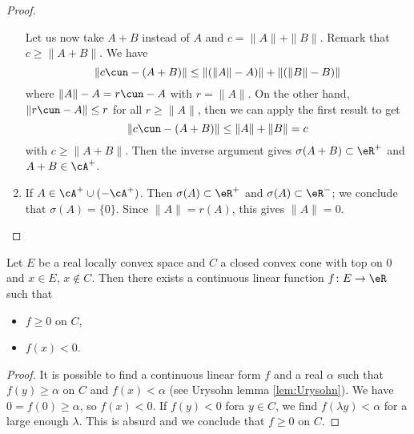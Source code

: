 \begin{proof}
\begin{enumerate}
                Let us now take $A+B$ instead of $A$ and $c=\| A \|+\| B \|$. Remark that $c\geq \| A+B \|$. We have
                \[ 
                    \| c\cun-(A+B) \|\leq\| (\| A \|-A) \|+\| (\| B \|-B) \|
                \]
                where $\| A \|-A=r\cun-A$ with $r=\| A \|$. On the other hand, $\| r\cun-A \|\leq r$ for all $r\geq\| A \|$, then we can apply the first result to get 
                \[ 
                    \| c\cun-(A+B) \|\leq \| A \|+\| B \|=c
                \]
                with $c\geq \| A+B \|$. Then the inverse argument gives $\sigma(A+B)\subset\eR^+$ and $A+B\in\cA^+$.

            \item

                If $A\in\cA^+\cup (-\cA^+)$. Then $\sigma(A)\subset\eR^+$ and $\sigma(A)\subset\eR^-$; we conclude that $\sigma(A)=\{  0\}$. Since $\| A \|=r(A)$, this gives $\| A \|=0$.
                
        \end{enumerate}
\end{proof}


\begin{proposition}
Let $E$ be a real locally convex space and $C$ a closed convex cone with top on $0$ and $x\in E$, $x\notin C$. Then there exists a continuous linear function $f\colon E\to \eR$ such that
\begin{itemize}
\item $f\geq 0$ on $C$,
\item $f(x)<0$.
\end{itemize}

\end{proposition}

\begin{proof}
It is possible to find a continuous linear form $f$ and a real $\alpha$ such that $f(y)\geq\alpha$ on $C$ and $f(x)<\alpha$ (see Urysohn lemma \ref{lem:Urysohn}). We have $0=f(0)\geq\alpha$, so $f(x)<0$. If $f(y)<0$ fora $y\in C$, we find $f(\lambda y)<\alpha$ for a large enough $\lambda$. This is absurd and we conclude that $f\geq0$ on $C$.
\end{proof}
